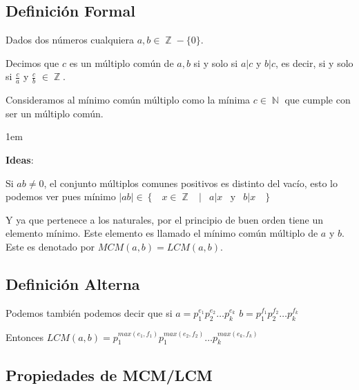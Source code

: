 \documentclass[12pt, fleqn]{report}                             %
\newenvironment{SmallIndentation}[1][0.75em]                    %
    {\begin{adjustwidth}{#1}{}\begin{footnotesize}}                 %
    {\end{footnotesize}\end{adjustwidth}}                           %
\DeclareMathOperator \Space {\quad}                             %
\DeclareMathOperator \MiniSpace {\;}                            %
\newcommand \Such {\MiniSpace|\MiniSpace}                       %
\newcommand \Also {\MiniSpace \text{y} \MiniSpace}              %
\newcommand{\Set}[1]{\left\{ \MiniSpace #1 \MiniSpace \right\}} %
\DeclareMathOperator \Naturals  {\mathbb{N}}                     %
\DeclareMathOperator \Integers  {\mathbb{Z}}                     %
\begin{document}
        \subsection*{Definición Formal}

            Dados dos números cualquiera $a, b \in \Integers - \{0\}$.

            Decimos que $c$ es un múltiplo común de $a,b$ si y solo si $a|c$ y $b|c$, es decir,
            si y solo si $\frac{c}{a}$ y $\frac{c}{b}$ $\in \Integers$.

            Consideramos al mínimo común múltiplo como la mínima $c \in \Naturals$ que cumple
            con ser un múltiplo común.

            \begin{SmallIndentation}[1em]
                \textbf{Ideas}:

                Si $ab \neq 0$, el conjunto múltiplos comunes positivos es distinto del vacío,
                esto lo podemos ver pues mínimo $|ab| \in \Set{x \in \Integers \Such a|x \Also b|x}$

                Y ya que pertenece a los naturales, por el principio de buen orden tiene un
                elemento mínimo. Este elemento es llamado el mínimo común múltiplo de $a$ y $b$.
                Este es denotado por $MCM(a,b) = LCM(a,b)$.

            \end{SmallIndentation}


        \subsection*{Definición Alterna}

            Podemos también podemos decir que si
            $a = p_1^{e_1} p_2^{e_2} \dots p_k^{e_k}$
            $b = p_1^{f_1} p_2^{f_2} \dots p_k^{f_k}$

            Entonces $LCM(a, b) = p_1^{max(e_1, f_1)} p_1^{max(e_2, f_2)} \dots p_k^{max(e_k, f_k)}$



        \clearpage
        \subsection{Propiedades de MCM/LCM}
\end{document}
